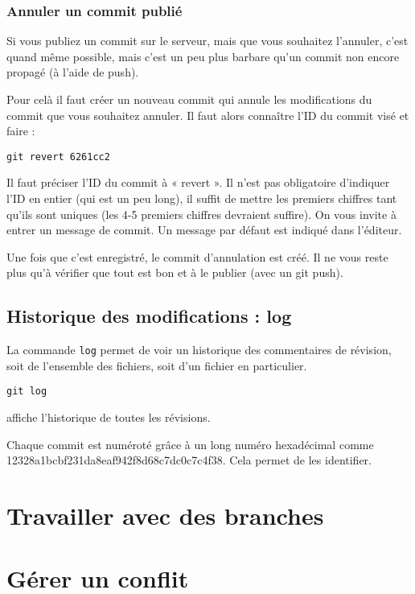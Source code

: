 \documentclass[a4paper,twoside]{article}
\begin{document}
\subsubsection{Annuler un commit publié}
Si vous publiez un commit sur le serveur, mais que vous souhaitez l'annuler, c'est quand même possible, mais c'est un peu plus barbare qu'un commit non encore propagé (à l'aide de push). 

Pour celà il faut créer un nouveau commit qui annule les modifications du commit que vous souhaitez annuler. Il faut alors connaître l'ID du commit visé et faire : 
\begin{verbatim}
git revert 6261cc2
\end{verbatim}
Il faut préciser l’ID du commit à « revert ». Il n’est pas obligatoire d’indiquer l’ID en entier (qui est un peu long), il suffit de mettre les premiers chiffres tant qu’ils sont uniques (les 4-5 premiers chiffres devraient suffire). On vous invite à entrer un message de commit. Un message par défaut est indiqué dans l’éditeur.

Une fois que c’est enregistré, le commit d’annulation est créé. Il ne vous reste plus qu’à vérifier que tout est bon et à le publier (avec un git push).

\subsection{Historique des modifications : log}
La commande \texttt{log} permet de voir un historique des commentaires de révision, soit de l'ensemble des fichiers, soit d'un fichier en particulier.

\begin{verbatim}
git log
\end{verbatim}
affiche l'historique de toutes les révisions.

\begin{attention}
Chaque commit est numéroté grâce à un long numéro hexadécimal comme 12328a1bcbf231da\-8eaf942f8d68c7dc0c7c4f38. Cela permet de les identifier.
\end{attention}

\section{Travailler avec des branches}

\section{Gérer un conflit}


\printindex
\end{document}
